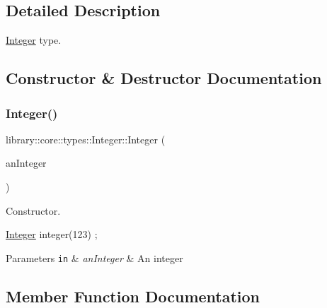 \subsection{Detailed Description}
\hyperlink{classlibrary_1_1core_1_1types_1_1_integer}{Integer} type. 

\subsection{Constructor \& Destructor Documentation}
\mbox{\label{classlibrary_1_1core_1_1types_1_1_integer_ac282b8e24c1d1a43e578c5be3c70ea27}} 
\subsubsection{\texorpdfstring{Integer()}{Integer()}}
{\footnotesize\ttfamily library\+::core\+::types\+::\+Integer\+::\+Integer (\begin{DoxyParamCaption}\item[{Integer\+::\+Value\+Type}]{an\+Integer }\end{DoxyParamCaption})}



Constructor. 


\begin{DoxyCode}
\hyperlink{classlibrary_1_1core_1_1types_1_1_integer_a6483b1c4e13e5ed6af5e7a58347efead}{Integer} integer(123) ;
\end{DoxyCode}



\begin{DoxyParams}[1]{Parameters}
\mbox{\tt in}  & {\em an\+Integer} & An integer \\
\hline
\end{DoxyParams}


\subsection{Member Function Documentation}
\mbox{\label{classlibrary_1_1core_1_1types_1_1_integer_a9145ffb6bca8771f06a3403056466d53}} 
